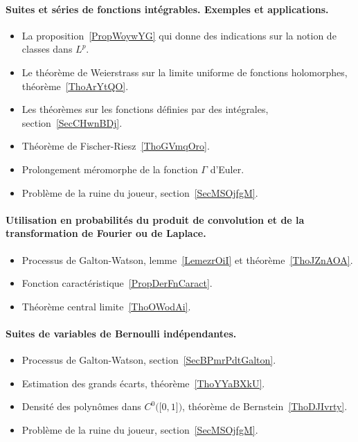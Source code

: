 \paragraph{Suites et séries de fonctions intégrables. Exemples et applications.}
\begin{itemize}
    \item La proposition~\ref{PropWoywYG} qui donne des indications sur la notion de classes dans \( L^p\).
    \item Le théorème de Weierstrass sur la limite uniforme de fonctions holomorphes, théorème~\ref{ThoArYtQO}.
    \item Les théorèmes sur les fonctions définies par des intégrales, section~\ref{SecCHwnBDj}.
    \item Théorème de Fischer-Riesz~\ref{ThoGVmqOro}.
    \item Prolongement méromorphe de la fonction \( \Gamma\) d'Euler.
    \item Problème de la ruine du joueur, section~\ref{SecMSOjfgM}.
\end{itemize}
\paragraph{Utilisation en probabilités du produit de convolution et de la transformation de Fourier ou de Laplace.}
\begin{itemize}
    \item Processus de Galton-Watson, lemme~\ref{LemezrOiI} et théorème~\ref{ThoJZnAOA}.
    \item Fonction caractéristique~\ref{PropDerFnCaract}.
    \item Théorème central limite~\ref{ThoOWodAi}.
\end{itemize}
\paragraph{Suites de variables de Bernoulli indépendantes.}
\begin{itemize}
    \item Processus de Galton-Watson, section~\ref{SecBPmrPdtGalton}.
    \item Estimation des grands écarts, théorème~\ref{ThoYYaBXkU}.
    \item Densité des polynômes dans \( C^0\big( \mathopen[ 0 , 1 \mathclose] \big)\), théorème de Bernstein~\ref{ThoDJIvrty}.
    \item Problème de la ruine du joueur, section~\ref{SecMSOjfgM}.
\end{itemize}
